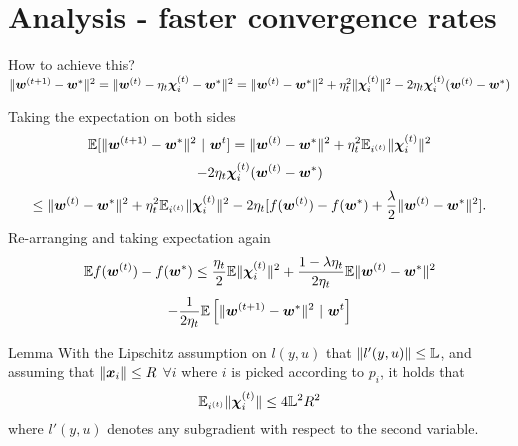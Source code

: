 
\section{Analysis - faster convergence rates}
\begin{frame}{How to achieve this?}
$\|\bm{w}^{(t+1)}-\bm{w}^*\|^2 = \|\bm{w}^{(t)} - \eta_t\bm{\chi}_i^{(t)} - \bm{w}^*\|^2
    = \|\bm{w}^{(t)} - \bm{w}^*\|^2 + \eta_t^2\|\bm{\chi}_i^{(t)}\|^2 - 2\eta_t\bm{\chi}_i^{(t)}(\bm{w}^{(t)} - \bm{w}^*    )$


Taking the expectation on both sides 
\[
        \mathbb{E}[ \|\bm{w}^{(t+1)}-\bm{w}^*\|^2  \ |\  \bm{w}^t ] 
        = \|\bm{w}^{(t)} - \bm{w}^*\|^2 + \eta_t^2\mathbb{E}_{i^{(t)}}\|\bm{\chi}_i^{(t)}\|^2 
\]
\[
    - 2\eta_t\bm{\chi}_i^{(t)}(\bm{w}^{(t)} - \bm{w}^*)
\]
\[
    \le \|\bm{w}^{(t)} - \bm{w}^*\|^2 + \eta_t^2\mathbb{E}_{i^{(t)}}\|\bm{\chi}_i^{(t)}\|^2 - 2\eta_t[f(\bm{w}^{(t)}) -      f(\bm{w}^*) + \frac{\lambda}{2}\|\bm{w}^{(t)}-\bm{w}^*\|^2].
\]
Re-arranging and taking expectation again
\[
    \mathbb{E} f(\bm{w}^{(t)})-f(\bm{w}^*) \le \frac{\eta_t}{2}\mathbb{E}\|\bm{\chi}_i^{(t)}\|^2+\frac{1-\lambda     \eta_t}{2\eta_t} \mathbb{E} \|\bm{w}^{(t)}-\bm{w}^*\|^2 
\]
\[
    - \frac{1}{2\eta_t}\E\left[  \|\wv^{(t+1)} - \wv^*\|^2  \ |\        \wv^t  \right] 
\]
\end{frame}

\begin{frame}{Lemma}
With the Lipschitz assumption on $l(y,u)$ that $\|l'(y,u)\| \le \mathbb{L}$, and assuming that $\|\bm{x}_i\|\le     R$ $\forall i$ where $i$ is picked according to $p_i$, it holds that
\[
    \mathbb{E}_{i^{(t)}} \|\bm{\chi}_i^{(t)}\|\le 4\mathbb{L}^2R^2
\]
where $l'(y,u)$ denotes any subgradient with respect to the second variable.

\end{frame}

